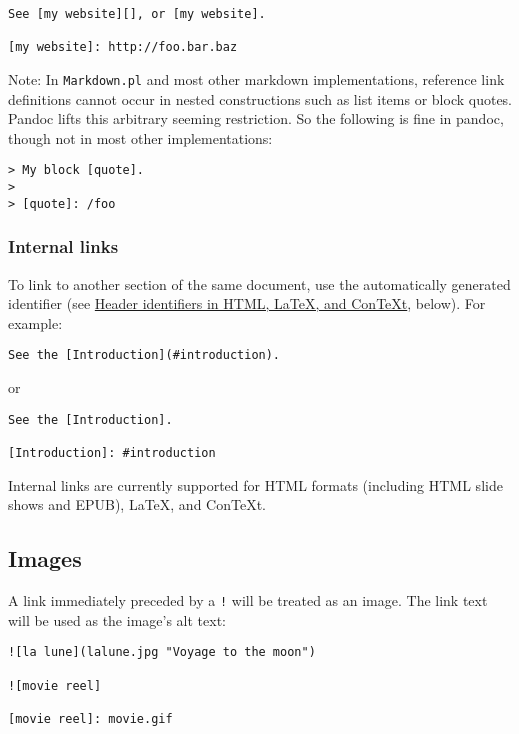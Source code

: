 \documentclass[]{article}
\begin{document}
\begin{verbatim}
See [my website][], or [my website].

[my website]: http://foo.bar.baz
\end{verbatim}

Note: In \texttt{Markdown.pl} and most other markdown implementations,
reference link definitions cannot occur in nested constructions such as
list items or block quotes. Pandoc lifts this arbitrary seeming
restriction. So the following is fine in pandoc, though not in most
other implementations:

\begin{verbatim}
> My block [quote].
>
> [quote]: /foo
\end{verbatim}

\subsubsection{Internal links}\label{internal-links}

To link to another section of the same document, use the automatically
generated identifier (see
\hyperref[header-identifiers-in-html-latex-and-context]{Header
identifiers in HTML, LaTeX, and ConTeXt}, below). For example:

\begin{verbatim}
See the [Introduction](#introduction).
\end{verbatim}

or

\begin{verbatim}
See the [Introduction].

[Introduction]: #introduction
\end{verbatim}

Internal links are currently supported for HTML formats (including HTML
slide shows and EPUB), LaTeX, and ConTeXt.

\subsection{Images}\label{images}

A link immediately preceded by a \texttt{!} will be treated as an image.
The link text will be used as the image's alt text:

\begin{verbatim}
![la lune](lalune.jpg "Voyage to the moon")

![movie reel]

[movie reel]: movie.gif
\end{verbatim}
\end{document}

